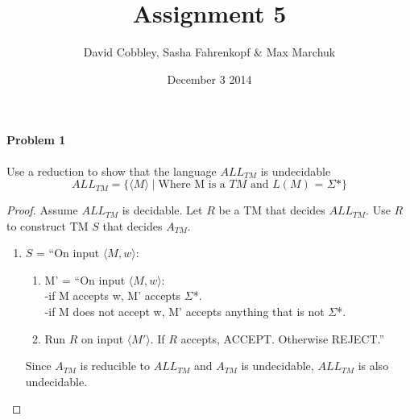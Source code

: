 \documentclass{article}
\title{Assignment 5}
\author{David Cobbley, Sasha Fahrenkopf \& Max Marchuk}
\date{December 3 2014}
\begin{document}
\maketitle


\paragraph{Problem 1} Use a reduction to show that the language $ALL_{TM}$ is undecidable
\[ALL_{TM} = \{ \langle M \rangle \;|\; \mbox{Where M is a $TM$ and $L(M)$ = $\Sigma$*}\} \]


\begin{proof}
    Assume $ALL_{TM}$ is decidable. Let $R$ be a TM that decides $ALL_{TM}$.  Use $R$ to construct TM $S$ that decides $A_{TM}$.
    \begin{enumerate}
        \item $S$ = ``On input $\langle M, w \rangle$:
            \begin{enumerate}[1.]
            \item M' = ``On input $\langle M, w \rangle$:
                \\-if M accepts w, M' accepts $\Sigma$*.
                \\-if M does not accept w, M' accepts anything that is not $\Sigma$*.
            \item Run $R$ on input $\langle M' \rangle$. If $R$ accepts, ACCEPT. Otherwise REJECT.''
            \end{enumerate}

        Since $A_{TM}$ is reducible to $ALL_{TM}$ and $A_{TM}$ is undecidable, $ALL_{TM}$ is also undecidable.
    \end{enumerate}
    \end{proof}
\end{document}
